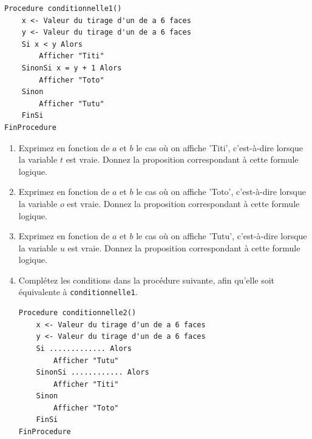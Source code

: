 \documentclass[a4paper,11pt]{article}
\begin{document}
\begin{lstlisting}
Procedure conditionnelle1()
    x <- Valeur du tirage d'un de a 6 faces
    y <- Valeur du tirage d'un de a 6 faces
    Si x < y Alors
        Afficher "Titi"
    SinonSi x = y + 1 Alors
        Afficher "Toto"
    Sinon
        Afficher "Tutu"
    FinSi
FinProcedure
\end{lstlisting}

\begin{enumerate}
\item Exprimez en fonction de $a$ et $b$ le cas où on affiche 'Titi', c'est-à-dire lorsque la variable $t$ est vraie. Donnez la proposition correspondant à cette formule logique.

\item Exprimez en fonction de $a$ et $b$ le cas où on affiche 'Toto', c'est-à-dire lorsque la variable $o$ est vraie. Donnez la proposition correspondant à cette formule logique.

\item Exprimez en fonction de $a$ et $b$ le cas où on affiche 'Tutu', c'est-à-dire lorsque la variable $u$ est vraie. Donnez la proposition correspondant à cette formule logique.

\item Complétez les conditions dans la procédure suivante, afin qu'elle soit équivalente à \texttt{conditionnelle1}.

\begin{lstlisting}
Procedure conditionnelle2()
    x <- Valeur du tirage d'un de a 6 faces
    y <- Valeur du tirage d'un de a 6 faces
    Si ............. Alors
        Afficher "Tutu"
    SinonSi ............ Alors
        Afficher "Titi"
    Sinon
        Afficher "Toto"
    FinSi
FinProcedure
\end{lstlisting}
\end{enumerate}
\end{document}
